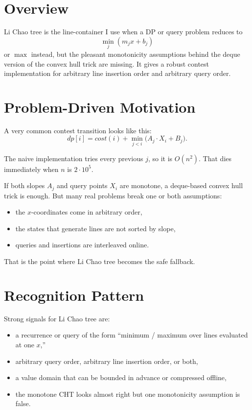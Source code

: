 \section*{Overview}

Li Chao tree is the line-container I use when a DP or query problem reduces to
\[
\min_j (m_j x + b_j)
\]
or \(\max\) instead, but the pleasant monotonicity assumptions behind the deque version of the convex hull trick are
missing. It gives a robust contest implementation for arbitrary line insertion order and arbitrary query order.

\section*{Problem-Driven Motivation}

A very common contest transition looks like this:
\[
dp[i] = cost(i) + \min_{j < i}\bigl(A_j \cdot X_i + B_j\bigr).
\]

The naive implementation tries every previous \(j\), so it is \(O(n^2)\). That dies immediately when \(n\) is
\(2 \cdot 10^5\).

If both slopes \(A_j\) and query points \(X_i\) are monotone, a deque-based convex hull trick is enough. But many real
problems break one or both assumptions:

\begin{itemize}
  \item the \(x\)-coordinates come in arbitrary order,
  \item the states that generate lines are not sorted by slope,
  \item queries and insertions are interleaved online.
\end{itemize}

That is the point where Li Chao tree becomes the safe fallback.

\section*{Recognition Pattern}

Strong signals for Li Chao tree are:

\begin{itemize}
  \item a recurrence or query of the form ``minimum / maximum over lines evaluated at one \(x\),''
  \item arbitrary query order, arbitrary line insertion order, or both,
  \item a value domain that can be bounded in advance or compressed offline,
  \item the monotone CHT looks almost right but one monotonicity assumption is false.
\end{itemize}

